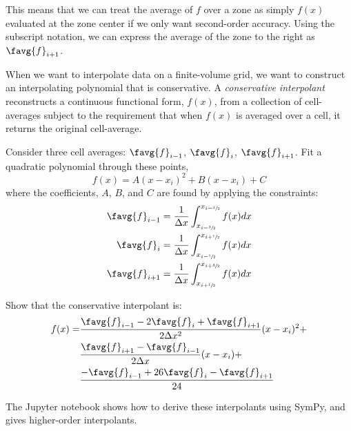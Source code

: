 This means that we can treat the average of $f$ over a zone as simply
$f(x)$ evaluated at the zone center if we only want second-order
accuracy.  Using the subscript notation, we can express the average of
the zone to the right as $\favg{f}_{i+1}$.

When we want to interpolate data on a finite-volume grid, we want to
construct an interpolating polynomial that is conservative.  A {\em
  conservative interpolant} reconstructs a continuous functional form,
$f(x)$, from a collection of cell-averages subject to the requirement
that when $f(x)$ is averaged over a cell, it returns the original
cell-average.

\begin{exercise}
{\label{ex:consinterp}

Consider three cell averages: $\favg{f}_{i-1}$, $\favg{f}_{i}$, $\favg{f}_{i+1}$.  Fit a quadratic polynomial through these points,
 \begin{equation}
 f(x) = A (x - x_i)^2 + B (x - x_i) + C
 \end{equation}
 where the coefficients, $A$, $B$, and $C$ are found by applying the constraints:
 \begin{align}
 \favg{f}_{i-1} &= \frac{1}{\Delta x}
      \int_{x_{i-\mythreehalf}}^{x_{i-\myhalf}} f(x) dx \\
 \favg{f}_{i} &= \frac{1}{\Delta x}
      \int_{x_{i-\myhalf}}^{x_{i+\myhalf}} f(x) dx \\
 \favg{f}_{i+1} &= \frac{1}{\Delta x}
      \int_{x_{i+\myhalf}}^{x_{i+\mythreehalf}} f(x) dx
 \end{align}

Show that the conservative interpolant is:
\begin{align}
f(x) = &\frac{\favg{f}_{i-1} - 2 \favg{f}_i +
             \favg{f}_{i+1}}{2\Delta x^2} (x-x_i)^2 + \nonumber \\
       &\frac{\favg{f}_{i+1} - \favg{f}_{i-1}}
            {2\Delta x} (x-x_i) + \nonumber \\
       &\frac{-\favg{f}_{i-1} + 26 \favg{f}_i
             -\favg{f}_{i+1}}{24}
\end{align}
}
\end{exercise}

The {\sf Jupyter} notebook
shows how to derive these interpolants using {\sf SymPy}, and gives
higher-order interpolants.


